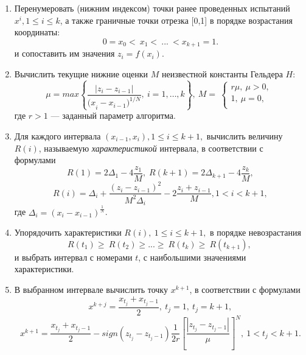\documentclass[12pt, a4paper, russian]{article}
\begin{document}
\begin{enumerate}

\item  Перенумеровать (нижним индексом) точки ранее проведенных испытаний $x^i, 1\leq i\leq k$, а также граничные точки отрезка [0,1] в порядке возрастания координаты:
 \begin{equation}
\label{agp1_sort}
	0=x_0<\ x_1<\ ...\ <x_{k+1}=1.
	\end{equation}
	и сопоставить им значения $z_i=f(x_i)$. 
	
\item  Вычислить текущие нижние оценки $M$ неизвестной константы Гельдера $H$:
 \begin{equation}
\label{agp2_mu}
	\mu=max\left\{\frac{|z_i-z_{i-1}|}{{{(x}_i-x_{i-1})}^{1/N}},\ i=1,\ldots,k\right\},\ M=\ \left\{\begin{matrix}r\mu,\ \mu>0,\\1,\ \mu=0,\\\end{matrix}\right.\
	\end{equation}
где $r>1$ --- заданный параметр алгоритма.
   
\item  Для каждого интервала $(x_{i-1},x_i), 1\leq i\leq k+1,$ вычислить величину $R(i)$, называемую \textit{характеристикой} интервала, в соответствии с формулами
\begin{equation}
\label{agp3_R1}
R(1)=2\Delta_1-4\dfrac{z_1}{M}, \; R(k+1)=2\Delta_{k+1}-4\dfrac{z_k}{M},
\end{equation}
\begin{equation}
\label{agp3_Ri}
R(i)=\Delta_i+\dfrac{(z_i-z_{i-1})^2}{M^2\Delta_i}-2\dfrac{z_i+z_{i-1}}{M},1<i<k+1,
\end{equation}
где \(\Delta_i=(x_i-x_{i-1})^\frac{1}{N}\).
   
\item   Упорядочить характеристики $R\left(i\right),\ 1\leq i \leq k+1,$ в порядке невозрастания 
\begin{equation}
\label{agp4_R_sort}
	R\left(t_1\right)\geq\ R\left(t_2\right)\geq...\geq\ R\left(t_k\right)\geq\ R(t_{k+1}),\ 
\end{equation}	
и выбрать интервал с номерами $t$, с наибольшими значениями характеристики.

\item  В выбранном интервале вычислить точку $x^{k+1}$, в соответствии с формулами
\begin{equation}
\label{agp5_x1}
	x^{k+j}=\frac{x_{t_j}+x_{t_j-1}}{2},\ t_j=1,\ t_j=k+1,
\end{equation}	
	\begin{equation}
\label{agp4_xi}	
	x^{k+1}=\frac{x_{t_j}+x_{t_j-1}}{2}-sign\left(z_{t_j}-z_{t_j-1}\right)\frac{1}{2r}\left[\frac{\left|z_{t_j}-z_{t_j-1}\right|}{\mu}\right]^N,\ 1<t_j<k+1.
\end{equation}	

\end{enumerate}
\end{document}
